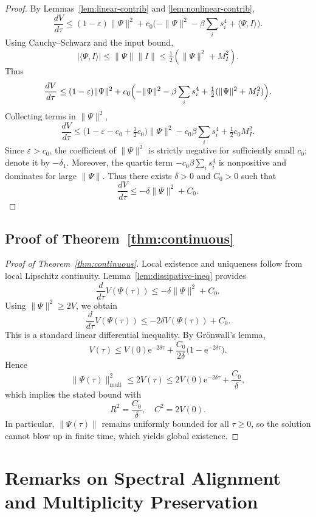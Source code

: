 \documentclass[11pt]{article}
\begin{document}
\begin{proof}
By Lemmas~\ref{lem:linear-contrib} and \ref{lem:nonlinear-contrib},
\[
\frac{dV}{d\tau}
\le (1-\varepsilon)\|\Psi\|^2
+ c_0\bigl(-\|\Psi\|^2 - \beta\sum_i s_i^4 + \langle\Psi,I\rangle\bigr).
\]
Using Cauchy–Schwarz and the input bound,
\[
|\langle\Psi,I\rangle| \le \|\Psi\|\|I\| \le \tfrac12(\|\Psi\|^2 + M_I^2).
\]
Thus
\[
\frac{dV}{d\tau}
\le (1-\varepsilon)\|\Psi\|^2
+ c_0\Bigl(-\|\Psi\|^2 - \beta\sum_i s_i^4 + \tfrac12(\|\Psi\|^2 + M_I^2)\Bigr).
\]
Collecting terms in \(\|\Psi\|^2\),
\[
\frac{dV}{d\tau}
\le \bigl(1-\varepsilon - c_0 + \tfrac12 c_0\bigr)\|\Psi\|^2
- c_0\beta \sum_i s_i^4 + \tfrac12 c_0 M_I^2.
\]
Since \(\varepsilon>c_0\), the coefficient of \(\|\Psi\|^2\) is strictly negative for sufficiently small \(c_0\); denote it by \(-\delta_1\).
Moreover, the quartic term \(-c_0\beta\sum_i s_i^4\) is nonpositive and dominates for large \(\|\Psi\|\).
Thus there exists \(\delta>0\) and \(C_0>0\) such that
\[
\frac{dV}{d\tau}
\le -\delta \|\Psi\|^2 + C_0.
\]
\end{proof}

\subsection{Proof of Theorem~\ref{thm:continuous}}

\begin{proof}[Proof of Theorem~\ref{thm:continuous}]
Local existence and uniqueness follow from local Lipschitz continuity.
Lemma~\ref{lem:dissipative-ineq} provides
\[
\frac{d}{d\tau}V(\Psi(\tau))
\le -\delta\|\Psi\|^2 + C_0.
\]
Using \(\|\Psi\|^2\ge 2V\), we obtain
\[
\frac{d}{d\tau}V(\Psi(\tau))
\le -2\delta V(\Psi(\tau)) + C_0.
\]
This is a standard linear differential inequality.
By Grönwall's lemma,
\[
V(\tau)
\le V(0)\mathrm{e}^{-2\delta \tau}
+ \frac{C_0}{2\delta}\bigl(1 - \mathrm{e}^{-2\delta \tau}\bigr).
\]
Hence
\[
\|\Psi(\tau)\|_{\mathrm{mult}}^2
\le 2V(\tau)
\le 2V(0)\mathrm{e}^{-2\delta \tau}
+ \frac{C_0}{\delta},
\]
which implies the stated bound with
\[
R^2 = \frac{C_0}{\delta}, \quad C^2 = 2V(0).
\]
In particular, \(\|\Psi(\tau)\|\) remains uniformly bounded for all \(\tau\ge 0\), so the solution cannot blow up in finite time, which yields global existence.
\end{proof}

\section{Remarks on Spectral Alignment and Multiplicity Preservation}
\end{document}
